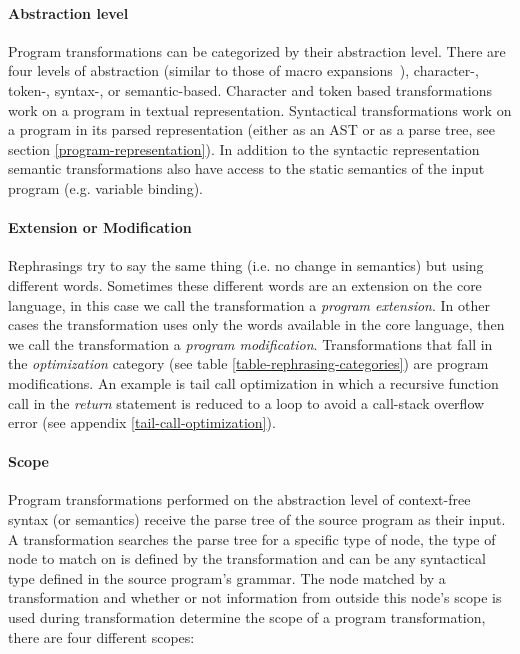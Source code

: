 \paragraph{Abstraction level}
Program transformations can be categorized by their abstraction level. There are four levels of abstraction (similar to those of macro expansions~\cite{Weise1993}), character-, token-, syntax-, or semantic-based. Character and token based transformations work on a program in textual representation. Syntactical transformations work on a program in its parsed representation (either as an AST or as a parse tree, see section \ref{program-representation}). In addition to the syntactic representation semantic transformations also have access to the static semantics of the input program (e.g. variable binding).

\paragraph{Extension or Modification}
Rephrasings try to say the same thing (i.e. no change in semantics) but using different words\cite{Visser2001}. Sometimes these different words are an extension on the core language, in this case we call the transformation a \textit{program extension}. In other cases the transformation uses only the words available in the core language, then we call the transformation a \textit{program modification}. Transformations that fall in the \textit{optimization} category (see table \ref{table-rephrasing-categories}) are program modifications. An example is tail call optimization in which a recursive function call in the \textit{return} statement is reduced to a loop to avoid a call-stack overflow error (see appendix \ref{tail-call-optimization}).

\paragraph{Scope}
Program transformations performed on the abstraction level of context-free syntax (or semantics) receive the parse tree of the source program as their input. A transformation searches the parse tree for a specific type of node, the type of node to match on is defined by the transformation and can be any syntactical type defined in the source program's grammar. The node matched by a transformation and whether or not information from outside this node's scope is used during transformation determine the scope of a program transformation, there are four different scopes:

